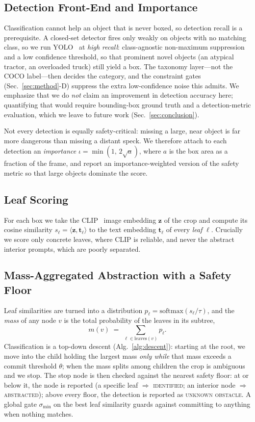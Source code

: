 \documentclass[conference]{IEEEtran}
\begin{document}
\subsection{Detection Front-End and Importance}
Classification cannot help an object that is never boxed, so detection recall is
a prerequisite. A closed-set detector fires only weakly on objects with no
matching class, so we run YOLO~\cite{redmon2016} at \emph{high recall}:
class-agnostic non-maximum suppression and a low confidence threshold, so that
prominent novel objects (an atypical tractor, an overloaded truck) still yield a
box. The taxonomy layer---not the COCO label---then decides the category, and the
constraint gates (Sec.~\ref{sec:method}-D) suppress the extra low-confidence
noise this admits. We emphasize that we do \emph{not} claim an improvement in
detection accuracy here; quantifying that would require bounding-box ground truth
and a detection-metric evaluation, which we leave to future work
(Sec.~\ref{sec:conclusion}).

Not every detection is equally safety-critical: missing a large, near object is
far more dangerous than missing a distant speck. We therefore attach to each
detection an \emph{importance} $\iota = \min(1,\,2\sqrt{a})$, where $a$ is the
box area as a fraction of the frame, and report an importance-weighted version
of the safety metric so that large objects dominate the score.

\subsection{Leaf Scoring}
For each box we take the CLIP~\cite{radford2021} image embedding $\mathbf{z}$ of
the crop and compute its cosine similarity $s_\ell =
\langle\mathbf{z},\mathbf{t}_\ell\rangle$ to the text embedding
$\mathbf{t}_\ell$ of every \emph{leaf} $\ell$. Crucially we score only concrete
leaves, where CLIP is reliable, and never the abstract interior prompts, which
are poorly separated.

\subsection{Mass-Aggregated Abstraction with a Safety Floor}
Leaf similarities are turned into a distribution
$p_\ell = \mathrm{softmax}(s_\ell/\tau)$, and the \emph{mass} of any node $v$ is
the total probability of the leaves in its subtree,
\begin{equation}
m(v) \;=\; \sum_{\ell \in \mathrm{leaves}(v)} p_\ell .
\label{eq:mass}
\end{equation}
Classification is a top-down descent (Alg.~\ref{alg:descent}): starting at the
root, we move into the child holding the largest mass \emph{only while} that mass
exceeds a commit threshold $\theta$; when the mass splits among children the crop
is ambiguous and we stop. The stop node is then checked against the nearest
safety floor: at or below it, the node is reported (a specific leaf $\Rightarrow$
\textsc{identified}; an interior node $\Rightarrow$ \textsc{abstracted}); above
every floor, the detection is reported as \textsc{unknown obstacle}. A global
gate $\sigma_{\min}$ on the best leaf similarity guards against committing to
anything when nothing matches.
\end{document}
